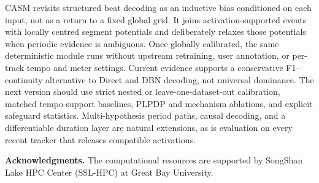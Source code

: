 \documentclass{article}
\begin{document}
CASM revisits structured beat decoding as an inductive bias conditioned on each input, not as a return to a fixed global grid. It joins activation-supported events with locally centred segment potentials and deliberately relaxes those potentials when periodic evidence is ambiguous. Once globally calibrated, the same deterministic module runs without upstream retraining, user annotation, or per-track tempo and meter settings. Current evidence supports a conservative F1--continuity alternative to Direct and DBN decoding, not universal dominance. The next version should use strict nested or leave-one-dataset-out calibration, matched tempo-support baselines, PLPDP and mechanism ablations, and explicit safeguard statistics. Multi-hypothesis period paths, causal decoding, and a differentiable duration layer are natural extensions, as is evaluation on every recent tracker that releases compatible activations.

\textbf{Acknowledgments.}
The computational resources are supported by SongShan Lake HPC
Center (SSL-HPC) at Great Bay University.



\end{document}
